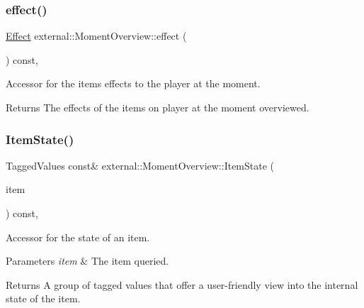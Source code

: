 \subsubsection{\texorpdfstring{effect()}{effect()}}
{\footnotesize\ttfamily \hyperlink{classitem_1_1_effect}{Effect} external\+::\+Moment\+Overview\+::effect (\begin{DoxyParamCaption}{ }\end{DoxyParamCaption}) const\hspace{0.3cm}{\ttfamily [inline]}, {\ttfamily [noexcept]}}



Accessor for the items\textquotesingle{} effects to the player at the moment. 

\begin{DoxyReturn}{Returns}
The effects of the items on player at the moment overviewed. 
\end{DoxyReturn}
\mbox{\label{classexternal_1_1_moment_overview_a0be90c4fbf03a2db4bfaa8a1ba2c7674}} 
\subsubsection{\texorpdfstring{Item\+State()}{ItemState()}}
{\footnotesize\ttfamily Tagged\+Values const\& external\+::\+Moment\+Overview\+::\+Item\+State (\begin{DoxyParamCaption}\item[{Item\+Type}]{item }\end{DoxyParamCaption}) const\hspace{0.3cm}{\ttfamily [inline]}, {\ttfamily [noexcept]}}



Accessor for the state of an item. 


\begin{DoxyParams}{Parameters}
{\em item} & The item queried. \\
\hline
\end{DoxyParams}
\begin{DoxyReturn}{Returns}
A group of tagged values that offer a user-\/friendly view into the internal state of the item. 
\end{DoxyReturn}
\mbox{\label{classexternal_1_1_moment_overview_a186a205fd74b30b627b82bf837b78f79}} 
